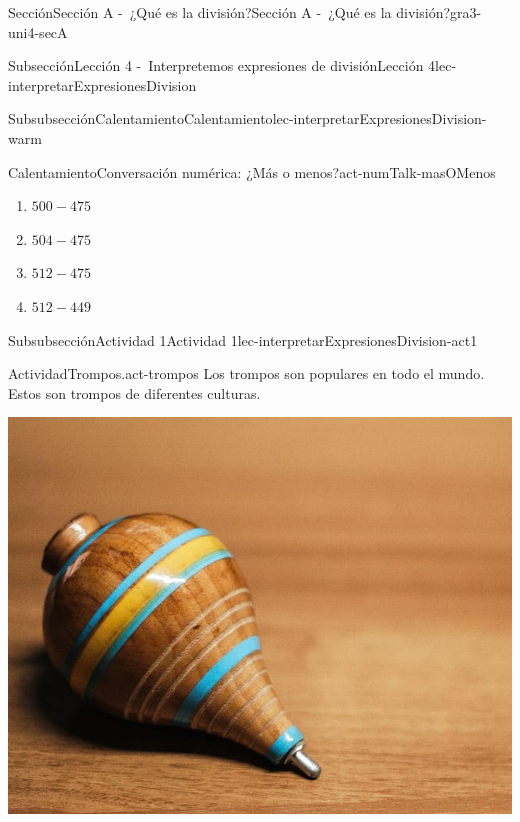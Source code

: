 \documentclass[twoside,10pt,]{article}
\begin{document}
\begin{sectionptx}{Sección}{Sección A -~¿Qué es la división?}{}{Sección A -~¿Qué es la división?}{}{}{gra3-uni4-secA}
\begin{subsectionptx}{Subsección}{Lección 4 -~Interpretemos expresiones de división}{}{Lección 4}{}{}{lec-interpretarExpresionesDivision}
\begin{subsubsectionptx}{Subsubsección}{Calentamiento}{}{Calentamiento}{}{}{lec-interpretarExpresionesDivision-warm}
\begin{exploration}{Calentamiento}{Conversación numérica: ¿Más o menos?}{act-numTalk-masOMenos}
\begin{enumerate}[label={\Alph*.}]
\item{}\(\displaystyle 500 - 475\)%
\item{}\(\displaystyle 504 - 475\)%
\item{}\(\displaystyle 512 - 475\)%
\item{}\(\displaystyle 512 - 449\)%
\end{enumerate}
\end{exploration}%
\end{subsubsectionptx}
%
%
\typeout{************************************************}
\typeout{************************************************}
%
\begin{subsubsectionptx}{Subsubsección}{Actividad 1}{}{Actividad 1}{}{}{lec-interpretarExpresionesDivision-act1}
\begin{activity}{Actividad}{Trompos.}{act-trompos}%
Los trompos son populares en todo el mundo. Estos son trompos de diferentes culturas.%
\begin{sidebyside}{5}{0}{0}{0}%
\begin{sbspanel}{0.2}%
\includegraphics[width=\linewidth]{external/jpg-source/V1 3.4.A.4 Mexican Trompo.jpg}
\end{sbspanel}%
\begin{sbspanel}{0.2}%

\end{sbspanel}
\end{sidebyside}
\end{activity}
\end{subsubsectionptx}
\end{subsectionptx}
\end{sectionptx}
\end{document}

